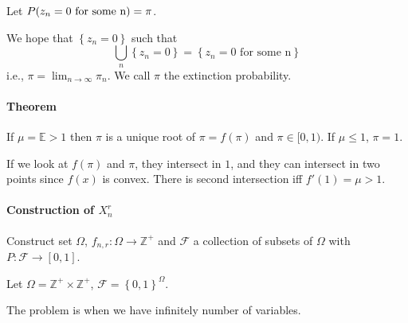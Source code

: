 Let $P\qty(z_n=0 \text{ for some n}) = \pi$.

We hope that $\left\{ z_n=0 \right\}$ such that
$$\bigcup_n \left\{ z_n=0 \right\} = \left\{ z_n=0 \text{ for some n}\right\}$$
i.e., $\pi = \lim_{n\to \infty} \pi_n$. We call $\pi$ the extinction probability.

\paragraph{Theorem} If $\mu=\mathbb{E} > 1$ then $\pi$ is a unique root of $\pi=f(\pi)$ and $\pi \in [0,1)$. If $\mu\leq 1$, $\pi=1$.

If we look at $f(\pi)$ and $\pi$, they intersect in $1$, and they can intersect in two points since $f(x)$ is convex. There is second intersection iff $f'(1) = \mu > 1$.

\paragraph{Construction of $X_n^r$}
Construct set $\Omega$, $f_{n,r}: \Omega \to \mathbb{Z}^+$ and $\mathcal{F}$ a collection of subsets of $\Omega$ with $P: \mathcal{F} \to [0,1]$.

Let $\Omega = \mathbb{Z}^+ \times \mathbb{Z}^+$, $\mathcal{F} = \left\{ 0,1 \right\}^\Omega$. 

The problem is when we have infinitely number of variables.